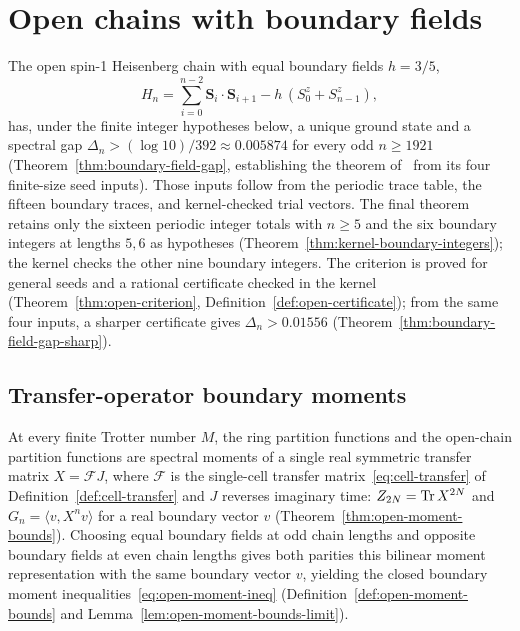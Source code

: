 \chapter{Open chains with boundary fields}
\label{chap:open}

The open spin-1 Heisenberg chain with equal boundary fields \(h = 3/5\),
\begin{equation}
  \label{eq:open-heisenberg-ham}
  H_n = \sum_{i=0}^{n-2} \mathbf S_i \cdot \mathbf S_{i+1} - h\,(S_0^z + S_{n-1}^z),
\end{equation}
has, under the finite integer hypotheses below, a unique ground state and a spectral gap
\(\Delta_n > (\log 10)/392 \approx 0.005874\) for every odd \(n \ge 1921\)
(Theorem~\ref{thm:boundary-field-gap}, establishing the theorem of~\cite{OpenAIBoundary}
from its four finite-size seed inputs). Those inputs follow from the periodic trace table,
the fifteen boundary traces, and kernel-checked trial vectors. The final theorem retains only
the sixteen periodic integer totals with \(n \ge 5\) and the six boundary integers at
lengths \(5,6\) as hypotheses (Theorem~\ref{thm:kernel-boundary-integers}); the kernel
checks the other nine boundary integers. The criterion is proved for general seeds and a
rational certificate checked in the kernel (Theorem~\ref{thm:open-criterion},
Definition~\ref{def:open-certificate}); from the same four inputs, a sharper certificate gives
\(\Delta_n > 0.01556\) (Theorem~\ref{thm:boundary-field-gap-sharp}).

\section{Transfer-operator boundary moments}

At every finite Trotter number \(M\), the ring partition functions and the open-chain partition
functions are spectral moments of a single real symmetric transfer matrix \(X = \mathcal F J\),
where \(\mathcal F\) is the single-cell transfer matrix~\eqref{eq:cell-transfer} of
Definition~\ref{def:cell-transfer} and \(J\) reverses imaginary time:
\(Z_{2N} = \operatorname{Tr} X^{2N}\) and \(G_n = \langle v, X^n v\rangle\) for a real boundary vector \(v\)
(Theorem~\ref{thm:open-moment-bounds}). Choosing equal boundary fields at odd chain lengths and
opposite boundary fields at even chain lengths gives both parities this bilinear moment
representation with the same boundary vector \(v\), yielding the closed boundary moment
inequalities~\eqref{eq:open-moment-ineq} (Definition~\ref{def:open-moment-bounds} and
Lemma~\ref{lem:open-moment-bounds-limit}).

